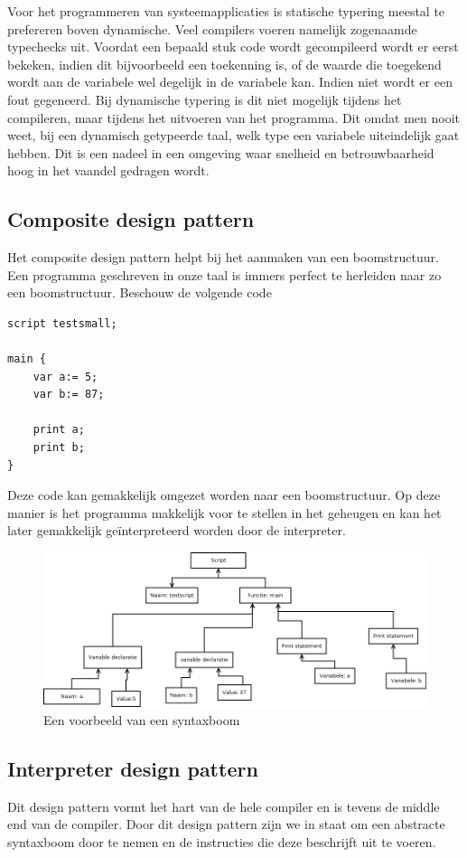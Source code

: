 \documentclass[11pt,a4paper]{article}
\begin{document}
Voor het programmeren van systeemapplicaties is statische typering meestal te prefereren boven dynamische. Veel compilers voeren namelijk zogenaamde typechecks uit. Voordat een bepaald stuk code wordt gecompileerd wordt er eerst bekeken, indien dit bijvoorbeeld een toekenning is, of de waarde die toegekend wordt aan de variabele wel degelijk in de variabele kan. Indien niet wordt er een fout gegeneerd. Bij dynamische typering is dit niet mogelijk tijdens het compileren, maar tijdens het uitvoeren van het programma. Dit omdat men nooit weet, bij een dynamisch getypeerde taal, welk type een variabele uiteindelijk gaat hebben. Dit is een nadeel in een omgeving waar snelheid en betrouwbaarheid hoog in het vaandel gedragen wordt. 

\subsection{Composite design pattern}
Het composite design pattern helpt bij het aanmaken van een boomstructuur. Een programma geschreven in onze taal is immers perfect te herleiden naar zo een boomstructuur. Beschouw de volgende code

\begin{verbatim}
script testsmall;

main {
	var a:= 5;
	var b:= 87;
	
	print a;
	print b;
}

\end{verbatim}
Deze code kan gemakkelijk omgezet worden naar een boomstructuur. Op deze manier is het programma makkelijk voor te stellen in het geheugen en kan het later gemakkelijk geïnterpreteerd worden door de interpreter.
\begin{figure}[ht]
\centering
\includegraphics[width=\textwidth]{afbeeldingen/testsmall_tree}
\caption{Een voorbeeld van een syntaxboom}
\end{figure}

\subsection{Interpreter design pattern}
Dit design pattern vormt het hart van de hele compiler en is tevens de middle end van de compiler. Door dit design pattern zijn we in staat om een abstracte syntaxboom door te nemen en de instructies die deze beschrijft uit te voeren.
\end{document}
